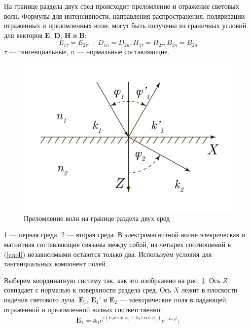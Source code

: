 \documentclass[a4paper, 12pt]{article}
\begin{document}
	На границе раздела двух сред происходит преломление и отражение световых волн. Формулы для интенсивности, направления распространения, поляризации отраженных и преломленных волн, могут быть получены из граничных условий для векторов $\boldsymbol{E}$, $\boldsymbol{D}$, $\boldsymbol{H}$ и $\boldsymbol{B}$:
	\begin{equation}
		E_{1\tau}=E_{2\tau},\quad D_{1n}=D_{2n}, H_{1\tau}=H_{2\tau}, B_{1n}=B_{2n}
		\label{eq:4}
	\end{equation}
	$\tau$ — тангенциальные, $n$ — нормальные составляющие.\\
	\begin{figure}
		\includegraphics[scale=0.2]{Graph1.pdf}
		\caption{Преломление волн на границе раздела двух сред}	
		\label{fig:pic1}
	\end{figure}
	1 — первая среда, 2 — вторая среда. В электромагнитной волне элекрическая и магнитная составляющие связаны между собой, из четырех соотношений в (\ref{eq:4}) независимыми остаются только два. Используем условия для тангенциальных компонент полей.\par
	Выберем координатную систему так, как это изображено на рис. \ref{fig:pic1}. Ось $Z$ совпадает с нормалью к поверхности раздела сред. Ось $X$ лежит в плоскости падения светового луча. $\boldsymbol{E}_1$, $\boldsymbol{E}_1'$ и $\boldsymbol{E}_2$ — электрические поля в падающей, отраженной и преломленной волнах соответственно:
	\begin{equation}
		\boldsymbol{E}_1=\boldsymbol{a}_1e^{i\left(k_1x\sin\varphi_1 + k_1z\cos \varphi_1 \right)}e^{-i\omega_1 t};
		\label{eq:5}
	\end{equation}
\end{document}
